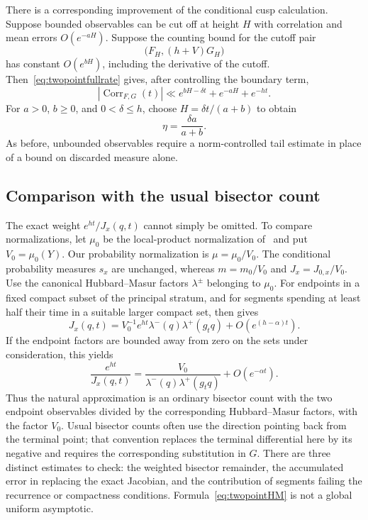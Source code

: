 \documentclass[11pt,a4paper]{article}
\numberwithin{equation}{section}
\theoremstyle{definition}
\theoremstyle{remark}
\begin{document}
There is a corresponding improvement of the conditional cusp
calculation. Suppose bounded observables can be cut off at height
$H$ with correlation and mean errors $O(e^{-aH})$. Suppose the
counting bound for the cutoff pair
\[
 \bigl(F_H,(h+V)G_H\bigr)
\]
has constant $O(e^{bH})$, including the derivative of the cutoff.
Then~\eqref{eq:twopointfullrate} gives, after controlling the
boundary term,
\[
 |\operatorname{Corr}_{F,G}(t)|
   \ll e^{bH-\delta t}+e^{-aH}+e^{-ht}.
\]
For $a>0$, $b\geq0$, and $0<\delta\leq h$, choose
$H=\delta t/(a+b)$ to obtain
\begin{equation}
 \eta=\frac{\delta a}{a+b}.
 \label{eq:twopointfullcusprate}
\end{equation}
As before, unbounded observables require a norm-controlled tail
estimate in place of a bound on discarded measure alone.


\subsection{Comparison with the usual bisector count}
\label{subsec:twopointjacobian}

The exact weight $e^{ht}/J_x(q,t)$ cannot simply be omitted.
To compare normalizations, let $\mu_0$ be the local-product
normalization of~\cite[Section 2.2]{ABEMPolar} and put
$V_0=\mu_0(Y)$. Our probability normalization is
$\mu=\mu_0/V_0$. The conditional probability measures $s_x$ are
unchanged, whereas $m=m_0/V_0$ and $J_x=J_{0,x}/V_0$.
Use the canonical Hubbard--Masur factors $\lambda^\pm$ belonging
to $\mu_0$. For endpoints in a fixed compact subset of the principal
stratum, and for segments spending at least half their time in a
suitable larger compact set,
\cite[Proposition 2.5]{ABEMPolar} then gives
\begin{equation}
 J_x(q,t)
   =V_0^{-1}e^{ht}\lambda^-(q)\lambda^+(g_tq)
       +O(e^{(h-\alpha)t}).
 \label{eq:twopointHM}
\end{equation}
If the endpoint factors are bounded away from zero on the sets
under consideration, this yields
\begin{equation}
 \frac{e^{ht}}{J_x(q,t)}
   =\frac{V_0}{\lambda^-(q)\lambda^+(g_tq)}
      +O(e^{-\alpha t}).
 \label{eq:twopointinverseHM}
\end{equation}
Thus the natural approximation is an ordinary bisector count with
the two endpoint observables divided by the corresponding
Hubbard--Masur factors, with the factor $V_0$. Usual bisector counts
often use the direction pointing back from the terminal point;
that convention replaces the terminal differential here by its
negative and requires the corresponding substitution in $G$.
There are three distinct estimates to check:
the weighted bisector remainder, the accumulated error in replacing
the exact Jacobian, and the contribution of segments failing the
recurrence or compactness conditions. Formula~\eqref{eq:twopointHM}
is not a global uniform asymptotic.
\end{document}
